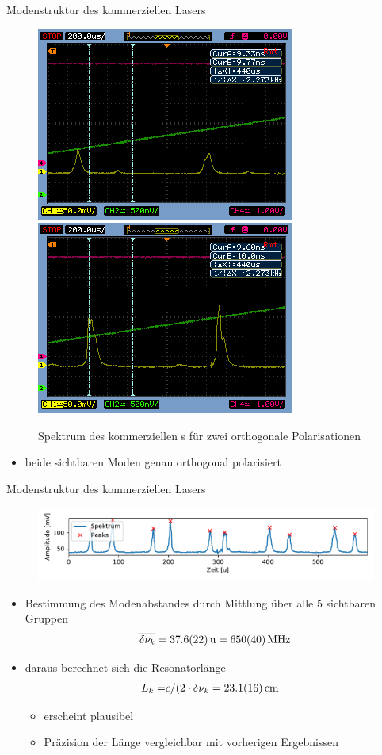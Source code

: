 \documentclass[10pt, aspectratio=169]{beamer}
\newcommand{\hne}{\ce{HeNe}}
\begin{document}
\begin{frame}{Modenstruktur des kommerziellen Lasers}
  \begin{figure}[b]\centering
    \includegraphics[width=.3\columnwidth]{pol1.png}
    \includegraphics[width=.3\columnwidth]{pol2.png}
    \caption[Gauss]{Spektrum des kommerziellen \hne{}s f\"ur zwei
      orthogonale Polarisationen}
  \end{figure}

  \begin{itemize}
  \item beide sichtbaren Moden genau orthogonal polarisiert
  \end{itemize}
\end{frame}

\begin{frame}{Modenstruktur des kommerziellen Lasers}
  \begin{figure}[b]\centering
    \includegraphics[width=1\columnwidth]{figs/komm_all_peaks.pdf}
  \end{figure}

  \begin{itemize}
  \item<1-> Bestimmung des Modenabstandes durch Mittlung \"uber alle
    \(5\) sichtbaren Gruppen
    \begin{equation}
      \label{eq:modeabstkom}
      \overline{\delta\nu_k}=\SI{37.6\pm 2.2}{u}=\SI{650\pm 40}{\mega\hertz}
    \end{equation}
  \item<2-> daraus berechnet sich die Resonatorlänge
    \begin{align}
      L_k =& c/(2\cdot \delta\nu_k = \SI{23.1\pm 1.6}{\centi\meter}
    \end{align}
    \begin{itemize}
    \item<3-> erscheint plausibel
    \item<3-> Pr\"azision der L\"ange vergleichbar mit vorherigen Ergebnissen
    \end{itemize}
  \end{itemize}
\end{frame}
\end{document}

